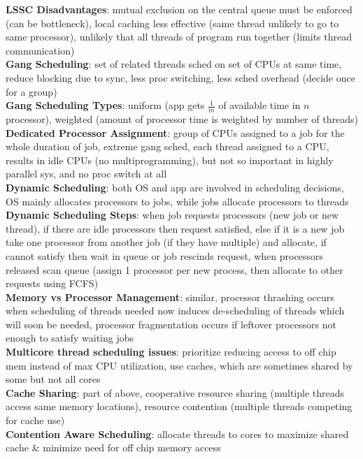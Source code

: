\documentclass[a4paper]{article}
\begin{document}
\begin{multicols}{2}
        \textbf{LSSC Disadvantages}: mutual exclusion on the central queue must be enforced (can be bottleneck), local caching less effective (same thread unlikely to go to same processor), unlikely that all threads of program run together (limits thread communication)\\
        \textbf{Gang Scheduling}: set of related threads sched on set of CPUs at same time, reduce blocking due to sync, less proc switching, less sched overhead (decide once for a group)\\
        \textbf{Gang Scheduling Types}: uniform (app gets $\frac{1}{m}$ of available time in $n$ processor), weighted (amount of processor time is weighted by number of threads)\\
        \textbf{Dedicated Processor Assignment}: group of CPUs assigned to a job for the whole duration of job, extreme gang sched, each thread assigned to a CPU, results in idle CPUs (no multiprogramming), but not so important in highly parallel sys, and no proc switch at all\\
        \textbf{Dynamic Scheduling}: both OS and app are involved in scheduling decisions, OS mainly allocates processors to jobs, while jobs allocate processors to threads\\
        \textbf{Dynamic Scheduling Steps}: when job requests processors (new job or new thread), if there are idle processors then request satisfied, else if it is a new job take one processor from another job (if they have multiple) and allocate, if cannot satisfy then wait in queue or job rescinds request, when processors released scan queue (assign 1 processor per new process, then allocate to other requests using FCFS)\\
        \textbf{Memory vs Processor Management}: similar, processor thrashing occurs when scheduling of threads needed now induces de-scheduling of threads which will soon be needed, processor fragmentation occurs if leftover processors not enough to satisfy waiting jobs\\
        \textbf{Multicore thread scheduling issues}: prioritize reducing access to off chip mem instead of max CPU utilization, use caches, which are sometimes shared by some but not all cores\\
        \textbf{Cache Sharing}: part of above, cooperative resource sharing (multiple threads access same memory locations), resource contention (multiple threads competing for cache use)\\
        \textbf{Contention Aware Scheduling}: allocate threads to cores to maximize shared cache \& minimize need for off chip memory access\\

\end{multicols}
\end{document}
